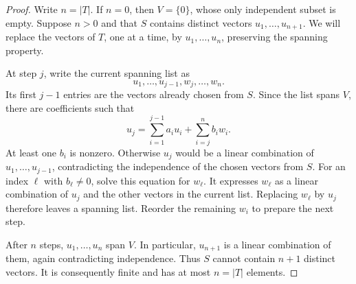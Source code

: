 \begin{pendingreview}
\begin{proof}
  Write \(n=|T|\). If \(n=0\), then \(V=\{0\}\), whose only independent
  subset is empty. Suppose \(n>0\) and that \(S\) contains distinct vectors
  \(u_1,\ldots,u_{n+1}\). We will replace the vectors of \(T\), one at a
  time, by \(u_1,\ldots,u_n\), preserving the spanning property.

  At step \(j\), write the current spanning list as
  \[
    u_1,\ldots,u_{j-1},w_j,\ldots,w_n.
  \]
  Its first \(j-1\) entries are the vectors already chosen from \(S\).
  Since the list spans \(V\), there are coefficients such that
  \[
    u_j=\sum_{i=1}^{j-1}a_i u_i+\sum_{i=j}^n b_iw_i.
  \]
  At least one \(b_i\) is nonzero. Otherwise \(u_j\) would be a linear
  combination of \(u_1,\ldots,u_{j-1}\), contradicting the independence
  of the chosen vectors from \(S\). For an index \(\ell\) with
  \(b_\ell\ne0\), solve this equation for \(w_\ell\). It expresses
  \(w_\ell\) as a linear combination of \(u_j\) and the other vectors
  in the current list. Replacing \(w_\ell\) by \(u_j\) therefore leaves
  a spanning list. Reorder the remaining \(w_i\) to prepare the next step.

  After \(n\) steps, \(u_1,\ldots,u_n\) span \(V\). In particular,
  \(u_{n+1}\) is a linear combination of them, again contradicting
  independence. Thus \(S\) cannot contain \(n+1\) distinct vectors.
  It is consequently finite and has at most \(n=|T|\) elements.
\end{proof}
\end{pendingreview}

